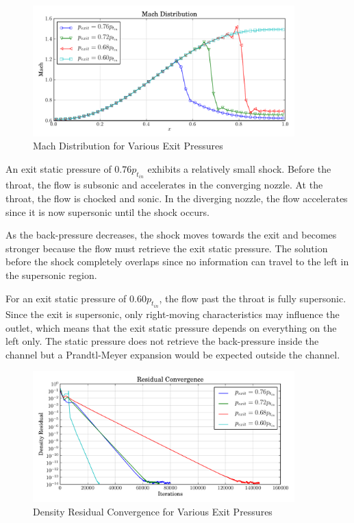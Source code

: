 \documentclass[letterpaper,12pt,]{article}
\begin{document}
\begin{figure}[!ht]
    \centering
    \includegraphics[width = 0.9\textwidth]{./figures/q2m.pdf}
    \caption {Mach Distribution for Various Exit Pressures}
    \label{fig:q2m}
\end{figure}

An exit static pressure of $0.76p_{t_{in}}$ exhibits a relatively small shock.
Before the throat, the flow is subsonic and accelerates in the converging nozzle.
At the throat, the flow is chocked and sonic.
In the diverging nozzle, the flow accelerates since it is now supersonic until the shock occurs.

As the back-pressure decreases, the shock moves towards the exit and becomes stronger because the flow must retrieve the exit static pressure.
The solution before the shock completely overlaps since no information can travel to the left in the supersonic region.

For an exit static pressure of $0.60p_{t_{in}}$, the flow past the throat is fully supersonic.
Since the exit is supersonic, only right-moving characteristics may influence the outlet, which means that the exit static pressure depends on everything on the left only.
The static pressure does not retrieve the back-pressure inside the channel but a Prandtl-Meyer expansion would be expected outside the channel.

\begin{figure}[!ht]
    \centering
    \includegraphics[width = 0.9\textwidth]{./figures/q2c.pdf}
    \caption {Density Residual Convergence for Various Exit Pressures}
    \label{fig:q2c}
\end{figure}
\end{document}
